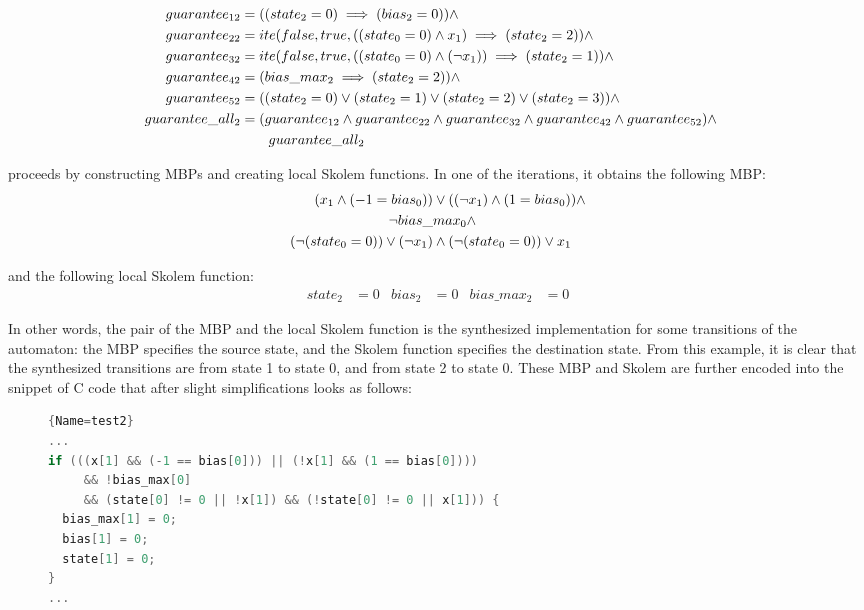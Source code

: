 \begin{equation}
\begin{aligned}
  guarantee_{12}&=((state_2=0)\implies (bias_2=0)) \land\\
  guarantee_{22}&=ite(false, true, ((state_0=0)\land x_1)\implies (state_2=2)) \land\\
  guarantee_{32}&=ite(false, true, ((state_0=0)\land (\neg x_1))\implies (state_2=1)) \land\\
  guarantee_{42}&=(bias\_max_2\implies (state_2=2)) \land\\
  guarantee_{52}&=((state_2=0) \lor (state_2=1) \lor (state_2=2) \lor (state_2=3))\land \\
  guarantee\_all_2&=(guarantee_{12}\land guarantee_{22}\land guarantee_{32}\land guarantee_{42} \land guarantee_{52})\land \\
  &\qquad {} guarantee\_all_2&\notag
\end{aligned}
\end{equation}

\aeval proceeds by constructing MBPs and creating local Skolem functions. 
In one of the iterations, it obtains the following MBP:%
\begin{equation}
\begin{aligned}
  (x_1\land (-1=bias_0)) &\lor ((\neg x_1)\land (1=bias_0)) \land \\
  \neg bias\_&max_0 \land \\
  (\neg (state_0=0))\lor (\neg x_1) &\land
  (\neg (state_0=0))\lor x_1  \notag
\end{aligned}
\end{equation}

and the following local Skolem function:%
\begin{align*}
  state_2&=0 &
  bias_2&=0 &
  bias\_max_2&=0
\end{align*}

In other words, the pair of the MBP and the local Skolem function is the synthesized implementation for some transitions of the automaton: the MBP specifies the source state, and the Skolem function specifies the destination state.
From this example, it is clear that the synthesized transitions are from state 1 to state 0, and from state 2 to state 0.
These MBP and Skolem are further encoded into the snippet of C code that after slight simplifications looks as follows:

\begin{figure}[h]
\begin{lstlisting}[language=C]{Name=test2}
...
if (((x[1] && (-1 == bias[0])) || (!x[1] && (1 == bias[0])))
     && !bias_max[0] 
     && (state[0] != 0 || !x[1]) && (!state[0] != 0 || x[1])) {
  bias_max[1] = 0;
  bias[1] = 0;
  state[1] = 0;
}
...
\end{lstlisting}
\end{figure}